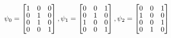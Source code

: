 $\psi_{0} =
\begin{bmatrix} \vspace{-2pt}
1 & 0 & 0 \\  \vspace{-2pt}
0 & 1 & 0 \\  \vspace{-2pt}
0 & 1 & 0 \\  \vspace{-1pt}
0 & 0 & 1
\end{bmatrix}, 
\psi_{1} =
\begin{bmatrix} \vspace{-2pt}
0 & 0 & 1 \\  \vspace{-2pt}
0 & 1 & 0 \\  \vspace{-2pt}
1 & 0 & 0 \\  \vspace{-1pt}
0 & 0 & 1 
\end{bmatrix},
\psi_{2} =
\begin{bmatrix} \vspace{-2pt}
0 & 0 & 1 \\  \vspace{-2pt}
1 & 0 & 0 \\  \vspace{-2pt}
0 & 0 & 1 \\  \vspace{-1pt}
0 & 1 & 0  
\end{bmatrix}$
